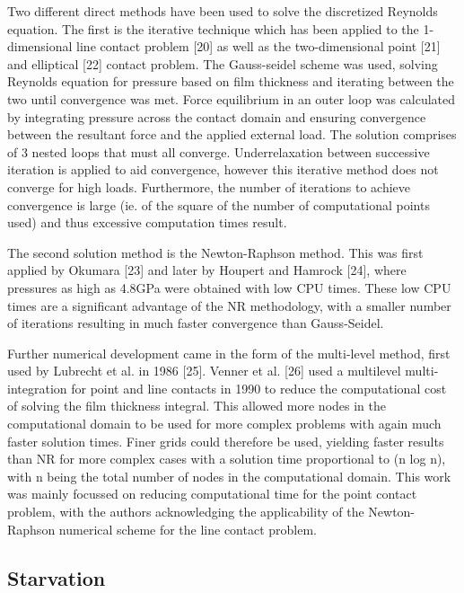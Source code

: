 Two different direct methods have been used to solve the discretized Reynolds equation. The first is the iterative technique which has been applied to the 1-dimensional line contact problem [20] as well as the two-dimensional point [21] and elliptical [22] contact problem. The Gauss-seidel scheme was used, solving Reynolds equation for pressure based on film thickness and iterating between the two until convergence was met. Force equilibrium in an outer loop was calculated by integrating pressure across the contact domain and ensuring convergence between the resultant force and the applied external load. The solution comprises of 3 nested loops that must all converge. Underrelaxation between successive iteration is applied to aid convergence, however this iterative method does not converge for high loads. Furthermore, the number of iterations to achieve convergence is large (ie. of the square of the number of computational points used) and thus excessive computation times result.

The second solution method is the Newton-Raphson method. This was first applied by Okumara [23] and later by Houpert and Hamrock [24], where pressures as high as 4.8GPa were obtained with low CPU times. These low CPU times are a significant advantage of the NR methodology, with a smaller number of iterations resulting in much faster convergence than Gauss-Seidel.

Further numerical development came in the form of the multi-level method, first used by Lubrecht et al. in 1986 [25]. Venner et al. [26] used a multilevel multi-integration for point and line contacts in 1990 to reduce the computational cost of solving the film thickness integral. This allowed more nodes in the computational domain to be used for more complex problems with again much faster solution times. Finer grids could therefore be used, yielding faster results than NR for more complex cases with a solution time proportional to (n log n), with n being the total number of nodes in the computational domain. This work was mainly focussed on reducing computational time for the point contact problem, with the authors acknowledging the applicability of the Newton-Raphson numerical scheme for the line contact problem.

\subsection{Starvation}

